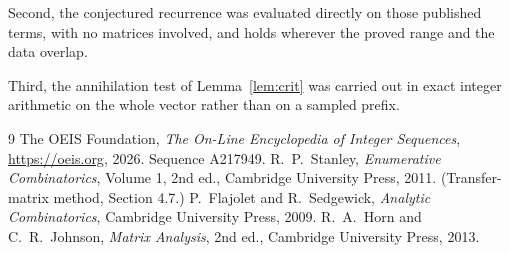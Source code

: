 \documentclass[11pt,a4paper]{article}
\theoremstyle{plain}
\theoremstyle{definition}
\begin{document}
Second, the conjectured recurrence was evaluated directly on those published terms, with no
matrices involved, and holds wherever the proved range and the data overlap.

Third, the annihilation test of Lemma~\ref{lem:crit} was carried out in exact integer
arithmetic on the whole vector rather than on a sampled prefix.

\begin{thebibliography}{9}
 The OEIS Foundation, \emph{The On-Line Encyclopedia of Integer
Sequences}, \url{https://oeis.org}, 2026. Sequence A217949.
 R.~P.~Stanley, \emph{Enumerative Combinatorics}, Volume 1, 2nd ed.,
Cambridge University Press, 2011. (Transfer-matrix method, Section 4.7.)
 P.~Flajolet and R.~Sedgewick, \emph{Analytic Combinatorics}, Cambridge
University Press, 2009.
 R.~A.~Horn and C.~R.~Johnson, \emph{Matrix Analysis}, 2nd ed., Cambridge
University Press, 2013.
\end{thebibliography}
\end{document}
